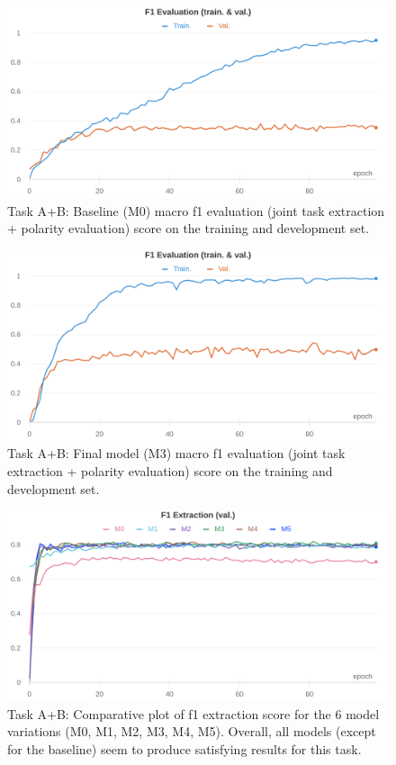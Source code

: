 \documentclass[11pt,a4paper]{article}
\begin{document}
	\begin{figure}[H]
		\centering
		\includegraphics[width=1\columnwidth]{M0_ab_f1_eval.png}
		\caption{Task A+B: Baseline (M0) macro f1 evaluation (joint task extraction + polarity evaluation) score on the training and development set.}
		\label{fig:M0_eval}
	\end{figure}
	
	\begin{figure}[H]
		\centering
		\includegraphics[width=1\columnwidth]{M3_ab_f1_eval.png}
		\caption{Task A+B: Final model (M3) macro f1 evaluation (joint task extraction + polarity evaluation) score on the training and development set.}
		\label{fig:M3_eval}
	\end{figure}
	
	\begin{figure}[H]
		\centering
		\includegraphics[width=1\columnwidth]{ab_comparative_f1_extr.png}
		\caption{Task A+B: Comparative plot of f1 extraction score for the 6 model variations (M0, M1, M2, M3, M4, M5). Overall, all models (except for the baseline) seem to produce satisfying results for this task.}
		\label{fig:comparative_f1_extr}
	\end{figure}
	
\end{document}
